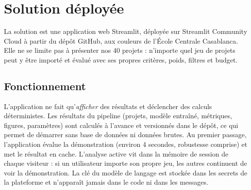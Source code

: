 \chapter{Solution déployée}\label{chap:solution}

La solution est une application web Streamlit, déployée sur Streamlit Community Cloud à partir du dépôt GitHub, aux
couleurs de l'École Centrale Casablanca. Elle ne se limite pas à présenter nos 40 projets : n'importe quel jeu de
projets peut y être importé et évalué avec ses propres critères, poids, filtres et budget.

\section{Fonctionnement}

L'application ne fait qu'\emph{afficher} des résultats et déclencher des calculs déterministes. Les résultats du
pipeline (projets, modèle entraîné, métriques, figures, paramètres) sont calculés à l'avance et versionnés dans le
dépôt, ce qui permet de démarrer sans base de données ni données brutes. Au premier passage, l'application évalue la
démonstration (environ 4 secondes, robustesse comprise) et met le résultat en cache. L'analyse active vit dans la
mémoire de session de chaque visiteur : si un utilisateur importe son propre jeu, les autres continuent de voir la
démonstration. La clé du modèle de langage est stockée dans les secrets de la plateforme et n'apparaît jamais dans le
code ni dans les messages.

